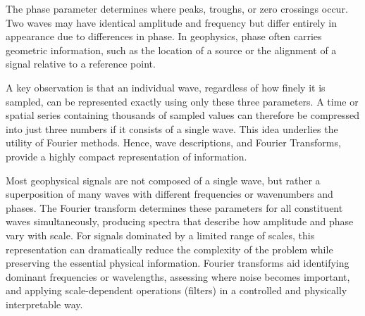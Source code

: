 The phase parameter determines where peaks, troughs, or zero crossings occur. Two waves may have identical amplitude and frequency but differ entirely in appearance due to differences in phase. In geophysics, phase often carries geometric information, such as the location of a source or the alignment of a signal relative to a reference point.

A key observation is that an individual wave, regardless of how finely it is sampled, can be represented exactly using only these three parameters. A time or spatial series containing thousands of sampled values can therefore be compressed into just three numbers if it consists of a single wave. This idea underlies the utility of Fourier methods. Hence, wave descriptions, and Fourier Transforms, provide a highly compact representation of information.

Most geophysical signals are not composed of a single wave, but rather a superposition of many waves with different frequencies or wavenumbers and phases. The Fourier transform determines these parameters for all constituent waves simultaneously, producing spectra that describe how amplitude and phase vary with scale. For signals dominated by a limited range of scales, this representation can dramatically reduce the complexity of the problem while preserving the essential physical information. Fourier transforms aid identifying dominant frequencies or wavelengths, assessing where noise becomes important, and applying scale-dependent operations (filters) in a controlled and physically interpretable way.






